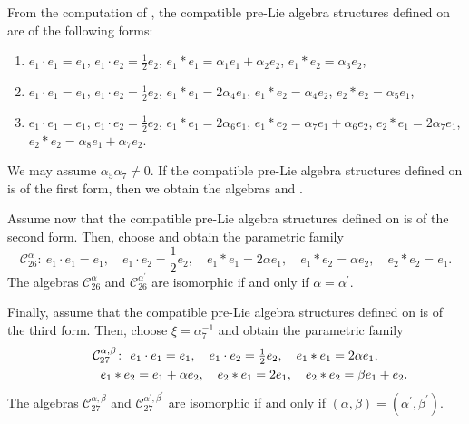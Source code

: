 \documentclass[10pt,a4paper]{amsart}
\numberwithin{equation}{section}
\begin{document}
From the computation of , the compatible pre-Lie
algebra structures defined on~ are of the following forms:
\begin{enumerate}\itemsep=0pt
\item[(1)] $e_{1}\cdot e_{1}=e_{1}$, $e_{1}\cdot e_{2}=\frac{1}{2}e_{2}$,
$e_{1}\ast e_{1}=\alpha _{1}e_{1}+\alpha _{2}e_{2}$, $e_{1}\ast
e_{2}=\alpha _{3}e_{2}$,

\item[(2)] $e_{1}\cdot e_{1}=e_{1}$, $e_{1}\cdot e_{2}=\frac{1}{2}e_{2}$,
$e_{1}\ast e_{1}=2\alpha _{4}e_{1}$, $e_{1}\ast e_{2}=\alpha _{4}e_{2}$,
$e_{2}\ast e_{2}=\alpha _{5}e_{1}$,

\item[(3)] $e_{1}\cdot e_{1}=e_{1}$, $e_{1}\cdot e_{2}=\frac{1}{2}e_{2}$,
$e_{1}\ast e_{1}=2\alpha _{6}e_{1}$, $e_{1}\ast e_{2}=\alpha
_{7}e_{1}+\alpha _{6}e_{2}$, $e_{2}\ast e_{1}=2\alpha _{7}e_{1}$, $%
e_{2}\ast e_{2}=\alpha _{8}e_{1}+\alpha _{7}e_{2}$.
\end{enumerate}

We may assume $\alpha _{5}\alpha _{7}\neq 0$.
If the compatible pre-Lie
algebra structures defined on  is of the
first form, then we obtain the algebras  and .

Assume now that the compatible pre-Lie algebra structures defined on  is of the second form. Then, choose  and obtain the parametric family
\[
\mathcal{C}_{26}^{\alpha } \colon \
e_{1}\cdot e_{1}=e_{1}, \quad e_{1}\cdot e_{2}=\frac{1}{2}e_{2}, \quad
e_{1}\ast e_{1}=2\alpha e_{1},\quad e_{1}\ast e_{2}=\alpha e_{2},\quad
e_{2}\ast e_{2}=e_{1}.
\]
The algebras $\mathcal{C}_{26}^{\alpha }$ and $\mathcal{C}_{26}^{\alpha ^{\prime
}}$ are isomorphic if and only if $\alpha =\alpha ^{\prime }$.

Finally, assume that the compatible pre-Lie algebra structures defined on \smash{$%
\mathcal{C}_{05}^{\frac{1}{2}}$} is of the third form. Then, choose $\xi =%
{\alpha^{-1} _{7}}$ and obtain the parametric family
\begin{gather*}
\mathcal{C}_{27}^{\alpha ,\beta } \colon \
e_{1}\cdot e_{1}=e_{1},\quad e_{1}\cdot e_{2}=\tfrac{1}{2}e_{2}, \quad
e_{1}\ast e_{1}=2\alpha e_{1}, \\
\hphantom{\mathcal{C}_{27}^{\alpha ,\beta } \colon} \ e_{1}\ast e_{2}=e_{1}+\alpha e_{2}, \quad
e_{2}\ast e_{1}=2e_{1},\quad e_{2}\ast e_{2}=\beta e_{1}+e_{2}.
\end{gather*}
The algebras $\mathcal{C}_{27}^{\alpha ,\beta }$ and $\mathcal{C}_{27}^{\alpha
^{\prime },\beta ^{\prime }}$ are isomorphic if and only if $(\alpha,\beta)= (\alpha^{\prime },\beta ^{\prime })$.
\end{document}
